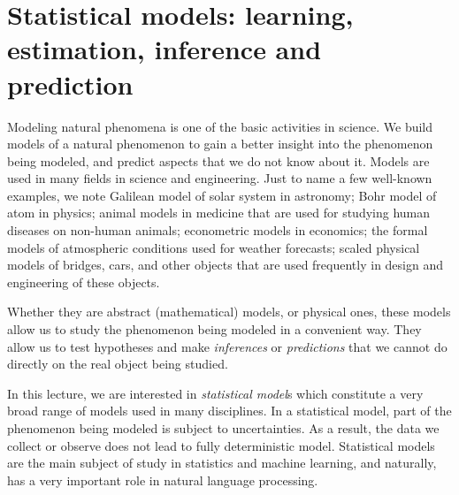 \chapter{\label{chap:inference}Statistical models:
  learning, estimation, inference and prediction}


Modeling natural phenomena is one of the basic activities in science.
We build models of a natural phenomenon to gain a better insight
into the phenomenon being modeled,
and predict aspects that we do not know about it.
Models are used in many fields in science and engineering.
Just to name a few well-known examples,
we note Galilean model of solar system in astronomy;
Bohr model of atom in physics;
animal models in medicine that are used for studying human diseases
on non-human animals;
econometric models in economics;
the formal models of atmospheric conditions used for weather forecasts; 
scaled physical models of bridges, cars, and other objects
that are used frequently in design and engineering of these objects.

Whether they are abstract (mathematical) models,
or physical ones,
these models allow us to study the phenomenon being modeled
in a convenient way.
They allow us to test hypotheses and make \emph{inferences}
or \emph{predictions} that we cannot do directly
on the real object being studied.

In this lecture, we are interested in
\emph{statistical model}s
which constitute a very broad range of models used in many disciplines.
In a statistical model,
part of the phenomenon being modeled is subject to uncertainties.
As a result,
the data we collect or observe does not lead to fully deterministic model. 
Statistical models are the main subject of study
in statistics and machine learning,
and naturally, has a very important role in natural language processing.

